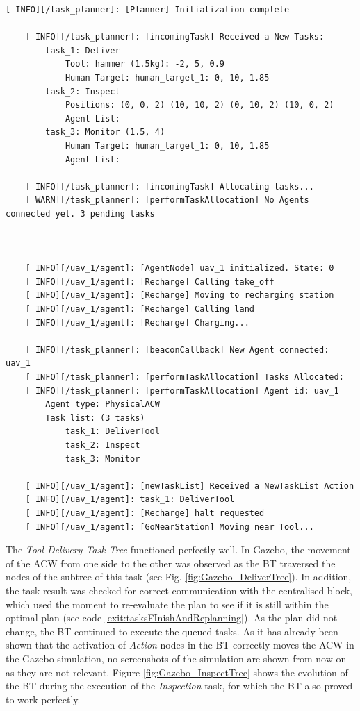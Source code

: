 \begin{lstlisting}[caption={Feedback of the task planning process and communications between \emph{High-Level Planner} and \emph{Agent Behaviour Manager}at the beginning of the simulation}, breaklines=true, label=exit:newtaskqueue]
    [ INFO][/task_planner]: [Planner] Initialization complete

    [ INFO][/task_planner]: [incomingTask] Received a New Tasks:
        task_1: Deliver
            Tool: hammer (1.5kg): -2, 5, 0.9
            Human Target: human_target_1: 0, 10, 1.85
        task_2: Inspect
            Positions: (0, 0, 2) (10, 10, 2) (0, 10, 2) (10, 0, 2)
            Agent List:
        task_3: Monitor (1.5, 4)
            Human Target: human_target_1: 0, 10, 1.85
            Agent List:
    
    [ INFO][/task_planner]: [incomingTask] Allocating tasks...
    [ WARN][/task_planner]: [performTaskAllocation] No Agents connected yet. 3 pending tasks
    
    
    
    [ INFO][/uav_1/agent]: [AgentNode] uav_1 initialized. State: 0
    [ INFO][/uav_1/agent]: [Recharge] Calling take_off
    [ INFO][/uav_1/agent]: [Recharge] Moving to recharging station
    [ INFO][/uav_1/agent]: [Recharge] Calling land
    [ INFO][/uav_1/agent]: [Recharge] Charging...
    
    [ INFO][/task_planner]: [beaconCallback] New Agent connected: uav_1
    [ INFO][/task_planner]: [performTaskAllocation] Tasks Allocated:
    [ INFO][/task_planner]: [performTaskAllocation] Agent id: uav_1
        Agent type: PhysicalACW
        Task list: (3 tasks)
            task_1: DeliverTool
            task_2: Inspect
            task_3: Monitor
    
    [ INFO][/uav_1/agent]: [newTaskList] Received a NewTaskList Action
    [ INFO][/uav_1/agent]: task_1: DeliverTool
    [ INFO][/uav_1/agent]: [Recharge] halt requested
    [ INFO][/uav_1/agent]: [GoNearStation] Moving near Tool...
\end{lstlisting}

The \emph{Tool Delivery Task Tree} functioned perfectly well. In Gazebo, the movement of the \gls{ACW} from one side to the other was observed as the \gls{BT} traversed the nodes of the subtree of this task (see Fig. \ref{fig:Gazebo_DeliverTree}). In addition, the task result was checked for correct communication with the centralised block, which used the moment to re-evaluate the plan to see if it is still within the optimal plan (see code \ref{exit:tasksFInishAndReplanning}). As the plan did not change, the \gls{BT} continued to execute the queued tasks. As it has already been shown that the activation of \emph{Action} nodes in the \gls{BT} correctly moves the \gls{ACW} in the Gazebo simulation, no screenshots of the simulation are shown from now on as they are not relevant. Figure \ref{fig:Gazebo_InspectTree} shows the evolution of the \gls{BT} during the execution of the \emph{Inspection} task, for which the \gls{BT} also proved to work perfectly. 

